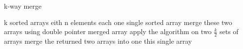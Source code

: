 \documentclass{article}
\begin{document}
	\begin{algorithm}[!h]
		\caption{k-way merge}  
		\label{whatever}  
		\begin{algorithmic}
			\Require  
			k sorted arrays eith n elements each
			\Ensure  
			one single sorted array
			\State merge these two arrays using double pointer
			\State\Return merged array
			\EndIf
			\State apply the algorithm on two $\frac{k}{2}$ sets of arrays
			\State merge the returned two arrays into one
			\Return this single array
		\end{algorithmic}  
	\end{algorithm}
\end{document}
